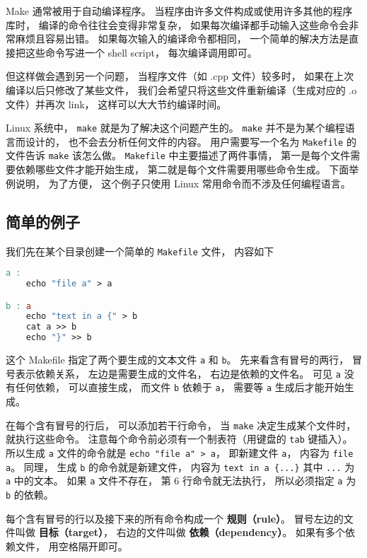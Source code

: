 
Make 通常被用于自动编译程序。 当程序由许多文件构成或使用许多其他的程序库时， 编译的命令往往会变得非常复杂， 如果每次编译都手动输入这些命令会非常麻烦且容易出错。 如果每次输入的编译命令都相同， 一个简单的解决方法是直接把这些命令写进一个 shell script， 每次编译调用即可。

但这样做会遇到另一个问题， 当程序文件（如 .cpp 文件）较多时， 如果在上次编译以后只修改了某些文件， 我们会希望只将这些文件重新编译（生成对应的 .o 文件）并再次 link， 这样可以大大节约编译时间。

Linux 系统中， \verb`make` 就是为了解决这个问题产生的。 \verb`make` 并不是为某个编程语言而设计的， 也不会去分析任何文件的内容。 用户需要写一个名为 \verb`Makefile` 的文件告诉 \verb`make` 该怎么做。 \verb`Makefile` 中主要描述了两件事情， 第一是每个文件需要依赖哪些文件才能开始生成， 第二就是每个文件需要用哪些命令生成。 下面举例说明， 为了方便， 这个例子只使用 Linux 常用命令而不涉及任何编程语言。


\subsection{简单的例子}
我们先在某个目录创建一个简单的 \verb`Makefile` 文件， 内容如下
\begin{lstlisting}[language=makefile, caption=Makefile]
a :
	echo "file a" > a

b : a
	echo "text in a {" > b
	cat a >> b
	echo "}" >> b
\end{lstlisting}
这个 Makefile 指定了两个要生成的文本文件 \verb`a` 和 \verb`b`。 先来看含有冒号的两行， 冒号表示依赖关系， 左边是需要生成的文件名， 右边是依赖的文件名。 可见 \verb`a` 没有任何依赖， 可以直接生成， 而文件 \verb`b` 依赖于 \verb`a`， 需要等 \verb`a` 生成后才能开始生成。

在每个含有冒号的行后， 可以添加若干行命令， 当 \verb`make` 决定生成某个文件时， 就执行这些命令。 注意每个命令前必须有一个制表符（用键盘的 \verb`tab` 键插入）。 所以生成 \verb`a` 文件的命令就是 \verb`echo "file a" > a`， 即新建文件 \verb`a`， 内容为 \verb`file a`。 同理， 生成 \verb`b` 的命令就是新建文件， 内容为 \verb`text in a {...}` 其中 \verb`...` 为 \verb`a` 中的文本。 如果 \verb`a` 文件不存在， 第 6 行命令就无法执行， 所以必须指定 \verb`a` 为 \verb`b` 的依赖。

每个含有冒号的行以及接下来的所有命令构成一个 \textbf{规则（rule）}。 冒号左边的文件叫做 \textbf{目标（target）}， 右边的文件叫做 \textbf{依赖（dependency）}。 如果有多个依赖文件， 用空格隔开即可。

